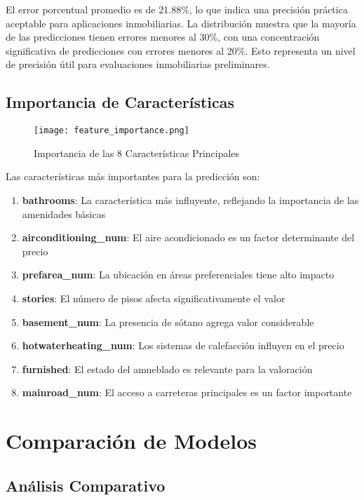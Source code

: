 \documentclass[11pt,a4paper]{article}
\begin{document}
El error porcentual promedio es de 21.88\%, lo que indica una precisión práctica aceptable para aplicaciones inmobiliarias. La distribución muestra que la mayoría de las predicciones tienen errores menores al 30\%, con una concentración significativa de predicciones con errores menores al 20\%. Esto representa un nivel de precisión útil para evaluaciones inmobiliarias preliminares.

\subsection{Importancia de Características}

\begin{figure}[H]
    \centering
    \texttt{[image: feature\_importance.png]}
    \caption{Importancia de las 8 Características Principales}
    \label{fig:feature_importance}
\end{figure}

Las características más importantes para la predicción son:
\begin{enumerate}
    \item \textbf{bathrooms}: La característica más influyente, reflejando la importancia de las amenidades básicas
    \item \textbf{airconditioning\_num}: El aire acondicionado es un factor determinante del precio
    \item \textbf{prefarea\_num}: La ubicación en áreas preferenciales tiene alto impacto
    \item \textbf{stories}: El número de pisos afecta significativamente el valor
    \item \textbf{basement\_num}: La presencia de sótano agrega valor considerable
    \item \textbf{hotwaterheating\_num}: Los sistemas de calefacción influyen en el precio
    \item \textbf{furnished}: El estado del amueblado es relevante para la valoración
    \item \textbf{mainroad\_num}: El acceso a carreteras principales es un factor importante
\end{enumerate}

\section{Comparación de Modelos}

\subsection{Análisis Comparativo}
\end{document}
